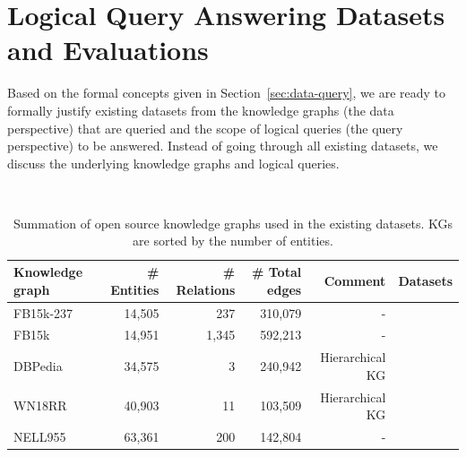 \documentclass[11pt]{article}
\begin{document}
\section{Logical Query Answering Datasets and Evaluations}\label{sec:dataset}
Based on the formal concepts given in Section~\ref{sec:data-query}, we are ready to formally justify existing datasets from the knowledge graphs (the data perspective) that are queried and the scope of logical queries (the query perspective) to be answered. Instead of going through all existing datasets, we discuss the underlying knowledge graphs and logical queries.

\begin{table}[t]
	\centering
	\caption{Summation of open source knowledge graphs used in the existing datasets. KGs are sorted by the number of entities.}~\label{tab:knowledge-graphs}
	\begin{tabular}{lrrrrr}
		\toprule
		Knowledge graph & \# Entities & \# Relations & \# Total edges & Comment & Datasets \\
		\midrule
		FB15k-237~\cite{Bordes2013TranslatingEmbeddings} & 14,505 & 237 & 310,079 & - & \cite{Ren2020Query2boxReasoning,Ren2020BetaEmbeddings,Galkin2022InductiveLogical,Hu2022TypeawareEmbeddings,Wang2021BenchmarkingCombinatorial}\\
		FB15k~\cite{Toutanova2015Observedlatent} & 14,951 & 1,345 & 592,213 & - & \cite{Ren2020Query2boxReasoning,Ren2020BetaEmbeddings,Wang2021BenchmarkingCombinatorial}\\
		DBPedia~\cite{Auer2007DBpediaNucleus} & 34,575 & 3 & 240,942 & Hierarchical KG & \cite{Choudhary2021SelfSupervisedHyperboloidc} \\
		WN18RR~\cite{Miller1995WordNetlexical} & 40,903 & 11 & 103,509 & Hierarchical KG & \cite{Huang2022LinELogical}\\
		NELL955~\cite{xiong2017deeppath} & 63,361 & 200 & 142,804 & - & \cite{Ren2020Query2boxReasoning,Ren2020BetaEmbeddings,Hu2022TypeawareEmbeddings,Wang2021BenchmarkingCombinatorial}\\

\end{tabular}
\end{table}
\end{document}
